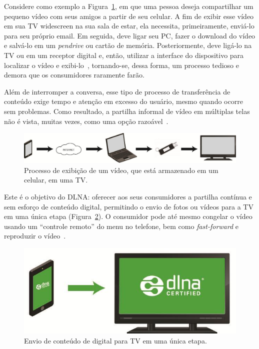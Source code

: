 Considere como exemplo a Figura~\ref{fig:traditionalProccess}, em que uma pessoa deseja compartilhar um pequeno vídeo com seus amigos a partir de seu celular. A fim de exibir esse vídeo em sua TV widescreen na sua sala de estar, ela necessita, primeiramente, enviá-lo para seu próprio email. Em seguida, deve ligar seu PC, fazer o download do vídeo e salvá-lo em um \emph{pendrive} ou cartão de memória. Posteriormente, deve ligá-lo na TV ou em um receptor digital e, então, utilizar a interface do dispositivo para localizar o vídeo e exibi-lo~\cite{dlnahdvideostreaming}, tornando-se, dessa forma, um processo tedioso e demora que os consumidores raramente farão.

Além de interromper a conversa, esse tipo de processo de transferência de conteúdo exige tempo e atenção em excesso do usuário, mesmo quando ocorre sem problemas. Como resultado, a partilha informal de vídeo em múltiplas telas não é vista, muitas vezes, como uma opção razoável~\cite{dlnahdvideostreaming}.

\begin{figure}[ht]
	\center
	\includegraphics[scale=0.3]{imagens/dlna1}
	\caption{Processo de exibição de um vídeo, que está armazenado em um celular, em uma TV.}
	\label{fig:traditionalProccess}
\end{figure}

Este é o objetivo do DLNA: oferecer aos seus consumidores a partilha contínua e sem esforço de conteúdo digital, permitindo o envio de fotos ou vídeos para a TV em uma única etapa (Figura~\ref{fig:dlnaProccess}). O consumidor pode até mesmo congelar o vídeo usando um ``controle remoto'' do menu no telefone, bem como \emph{fast-forward} e reproduzir o vídeo~\cite{dlnahdvideostreaming}.

\begin{figure}[ht]
	\center
	\includegraphics[scale=0.3]{imagens/dlna2}
	\caption{Envio de conteúdo de digital para TV em uma única etapa.}
	\label{fig:dlnaProccess}
\end{figure}

